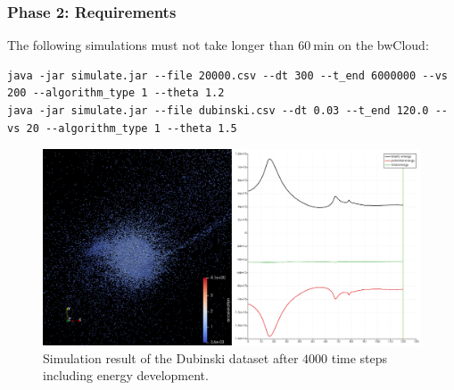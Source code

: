 \begin{frame}[fragile]
    \frametitle{Phase 2: Requirements}
    
    The following simulations must not take longer than $\SI{60}{\minute}$ on the bwCloud:
    \vspace*{-.5em}
    \begin{center}
    \setfontsize{7pt}
    \begin{verbatim}
java -jar simulate.jar --file 20000.csv --dt 300 --t_end 6000000 --vs 200 --algorithm_type 1 --theta 1.2
java -jar simulate.jar --file dubinski.csv --dt 0.03 --t_end 120.0 --vs 20 --algorithm_type 1 --theta 1.5
    \end{verbatim}
    \vspace*{-1.5em}
    \begin{figure}
        \captionsetup{justification=centering}
        \includegraphics[width=.65\textwidth]{figures/result_phase_2.png}
        \caption{Simulation result of the Dubinski dataset after $\num{4000}$ time steps including energy development.}
    \end{figure}
    \end{center}
\end{frame}


